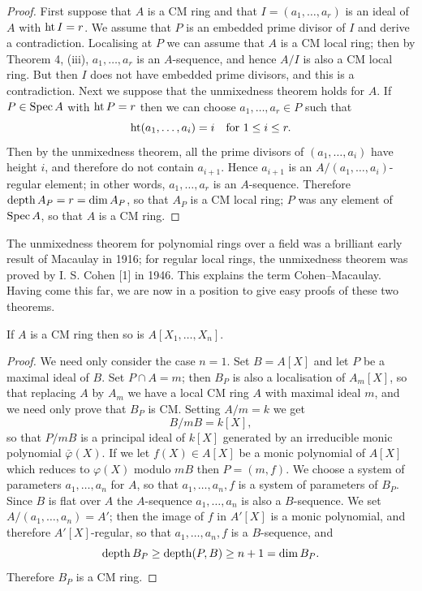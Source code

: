 \begin{proof}
First suppose that $A$ is a CM ring and that $I = (a_1, \ldots, a_r)$ is an
ideal of $A$ with $\operatorname{ht} I = r$. We assume that $P$ is an embedded prime divisor
of $I$ and derive a contradiction. Localising at $P$ we can assume that $A$ is
a CM local ring; then by Theorem 4, (iii), $a_1, \ldots, a_r$ is an $A$-sequence, and
hence $A/I$ is also a CM local ring. But then $I$ does not have embedded
prime divisors, and this is a contradiction. Next we suppose that the
unmixedness theorem holds for $A$. If $P \in \operatorname{Spec} A$ with $\operatorname{ht} P = r$ then we can
choose $a_1, \ldots, a_r \in P$ such that
\[
  \operatorname{ht}(a_1, \ldots, a_i) = i \quad \text{for } 1 \le i \le r.
\]
Then by the unmixedness theorem, all the prime divisors of $(a_1, \ldots, a_i)$
have height $i$, and therefore do not contain $a_{i+1}$. Hence $a_{i+1}$ is an
$A/(a_1, \ldots, a_i)$-regular element; in other words, $a_1, \ldots, a_r$ is an $A$-sequence.
Therefore $\operatorname{depth} A_P = r = \dim A_P$, so that $A_P$ is a CM local ring; $P$ was
any element of $\operatorname{Spec} A$, so that $A$ is a CM ring.
\end{proof}

The unmixedness theorem for polynomial rings over a field was a
brilliant early result of Macaulay in 1916; for regular local rings, the
unmixedness theorem was proved by I. S. Cohen [1] in 1946. This explains
the term Cohen--Macaulay. Having come this far, we are now in a position
to give easy proofs of these two theorems.

\begin{theorem}\label{thm:17.7}
If $A$ is a CM ring then so is $A[X_1, \ldots, X_n]$.
\end{theorem}

\begin{proof}
We need only consider the case $n = 1$. Set $B = A[X]$ and let $P$ be
a maximal ideal of $B$. Set $P \cap A = m$; then $B_P$ is also a localisation of
$A_m[X]$, so that replacing $A$ by $A_m$ we have a local CM ring
$A$ with maximal ideal $m$, and we need only prove that $B_P$ is CM. Setting
$A/m = k$ we get
\[
  B/mB = k[X],
\]
so that $P/mB$ is a principal ideal of $k[X]$ generated by an irreducible
monic polynomial $\bar{\varphi}(X)$. If we let $f(X) \in A[X]$ be a monic polynomial of
$A[X]$ which reduces to $\varphi(X)$ modulo $mB$ then $P = (m, f)$. We choose a
system of parameters $a_1, \ldots, a_n$ for $A$, so that $a_1, \ldots, a_n, f$ is a system of
parameters of $B_P$. Since $B$ is flat over $A$ the $A$-sequence $a_1, \ldots, a_n$ is also
a $B$-sequence. We set $A/(a_1, \ldots, a_n) = A'$; then the image of $f$ in $A'[X]$ is
a monic polynomial, and therefore $A'[X]$-regular, so that $a_1, \ldots, a_n, f$ is
a $B$-sequence, and
\[
  \operatorname{depth} B_P \ge \operatorname{depth} (P, B) \ge n + 1 = \dim B_P.
\]
Therefore $B_P$ is a CM ring.
\end{proof}

